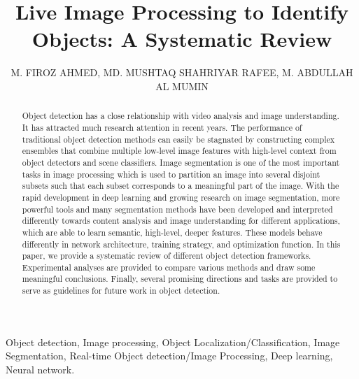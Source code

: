 \documentclass[two column]{ieeeaccess}
\begin{document}

\title{Live Image Processing to Identify Objects: A Systematic Review}
\author{\uppercase{M. Firoz Ahmed}, \uppercase{Md. Mushtaq Shahriyar Rafee}, \uppercase{M. Abdullah Al Mumin}}

\address{Department of Computer Science & Engineering, Shahjalal University of Science and Technology, Sylhet}




\begin{abstract}
Object detection has a close relationship with video analysis and image understanding. It has attracted much research attention in recent years. The performance of traditional object detection methods can easily be stagnated by constructing complex ensembles that combine multiple low-level image features with high-level context from object detectors and scene classifiers. Image segmentation is one of the most important tasks in image processing which is used to partition an image into several disjoint subsets such that each subset corresponds to a meaningful part of the image. With the rapid development in deep learning and growing research on image segmentation, more powerful tools and many segmentation methods have been developed and interpreted differently towards content analysis and image understanding for different applications, which are able to learn semantic, high-level, deeper features. These models behave differently in network architecture, training strategy, and optimization function. In this paper, we provide a systematic review of different object detection frameworks. Experimental analyses are provided to compare various methods and draw some meaningful conclusions. Finally, several promising directions and tasks are provided to serve as guidelines for future work in object detection.
\end{abstract}

\begin{keywords}
Object detection, Image processing, Object Localization/Classification, Image Segmentation, Real-time Object detection/Image Processing, Deep learning, Neural network.
\end{keywords}
\end{document}
